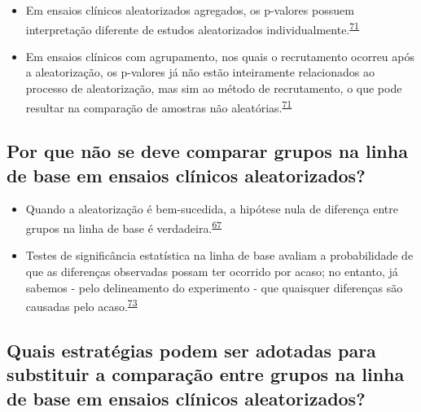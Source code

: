 \documentclass[
]{book}
\begin{document}
\begin{itemize}
\item
  Em ensaios clínicos aleatorizados agregados, os p-valores possuem interpretação diferente de estudos aleatorizados individualmente.\textsuperscript{\protect\hyperlink{ref-Bolzern2019}{71}}
\item
  Em ensaios clínicos com agrupamento, nos quais o recrutamento ocorreu após a aleatorização, os p-valores já não estão inteiramente relacionados ao processo de aleatorização, mas sim ao método de recrutamento, o que pode resultar na comparação de amostras não aleatórias.\textsuperscript{\protect\hyperlink{ref-Bolzern2019}{71}}
\end{itemize}

\hypertarget{por-que-nuxe3o-se-deve-comparar-grupos-na-linha-de-base-em-ensaios-cluxednicos-aleatorizados}{%
\subsection{Por que não se deve comparar grupos na linha de base em ensaios clínicos aleatorizados?}\label{por-que-nuxe3o-se-deve-comparar-grupos-na-linha-de-base-em-ensaios-cluxednicos-aleatorizados}}

\begin{itemize}
\item
  Quando a aleatorização é bem-sucedida, a hipótese nula de diferença entre grupos na linha de base é verdadeira.\textsuperscript{\protect\hyperlink{ref-roberts1999}{67}}
\item
  Testes de significância estatística na linha de base avaliam a probabilidade de que as diferenças observadas possam ter ocorrido por acaso; no entanto, já sabemos - pelo delineamento do experimento - que quaisquer diferenças são causadas pelo acaso.\textsuperscript{\protect\hyperlink{ref-gruijters2020}{73}}
\end{itemize}

\hypertarget{quais-estratuxe9gias-podem-ser-adotadas-para-substituir-a-comparauxe7uxe3o-entre-grupos-na-linha-de-base-em-ensaios-cluxednicos-aleatorizados}{%
\subsection{Quais estratégias podem ser adotadas para substituir a comparação entre grupos na linha de base em ensaios clínicos aleatorizados?}\label{quais-estratuxe9gias-podem-ser-adotadas-para-substituir-a-comparauxe7uxe3o-entre-grupos-na-linha-de-base-em-ensaios-cluxednicos-aleatorizados}}
\end{document}

